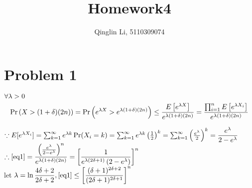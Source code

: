 \documentclass[12pt]{article}
\date{}
\title{Homework4}
\author{Qinglin Li, 5110309074}
\begin{document}
\maketitle
\section*{Problem 1}
$\forall \lambda>0$ 
\begin{equation}\label{eq1}
\Pr\left(X>(1+\delta)(2n)\right)=\Pr\left(e^{\lambda X}>e^{\lambda (1+\delta )(2n)}\right)\leq\dfrac{E\left[e^{\lambda X}\right]}{e^{\lambda (1+\delta )(2n)}}=\dfrac{\prod_{i=1}^nE\left[e^{\lambda X_i}\right]}{e^{\lambda (1+\delta )(2n)}}
\end{equation}

$\because E[e^{\lambda X_i}]=\sum_{k=1}^\infty e^{\lambda k}\Pr(X_i=k)=\sum_{k=1}^\infty e^{\lambda k}\left(\frac{1}{2}\right)^k=\sum_{k=1}^\infty \left(\frac{e^{\lambda}}{2}\right)^k=\dfrac{e^\lambda}{2-e^\lambda}$\\
$\therefore \eqref{eq1}=\dfrac{\left(\frac{e^\lambda}{2-e^\lambda}\right)^n}{e^{\lambda (1+\delta )(2n)}}=\left[\dfrac{1}{e^{\lambda(2\delta+1)}\left(2-e^\lambda\right)}\right]^n$\\
let $\lambda=\ln \dfrac{4\delta+2}{2\delta+2}, \eqref{eq1}\leq\left[\dfrac{(\delta+1)^{2\delta+2}}{(2\delta+1)^{2\delta+1}}\right]^n$ 
\end{document}
